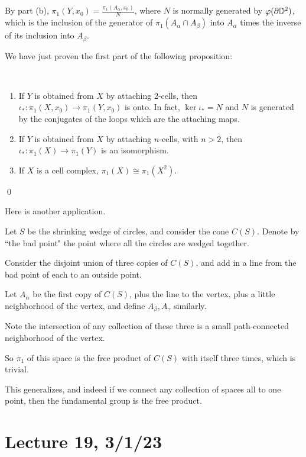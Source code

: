 \documentclass[x11names,reqno,14pt]{extarticle}
\begin{document}
By part (b), $\pi_1(Y, x_0) = \frac{\pi_1(A_\alpha, x_0)}{N}$, where $N$ is normally generated by $\varphi(\partial\mathbb{D}^2)$, which is the inclusion of the generator of $\pi_1(A_\alpha \cap A_\beta)$ into $A_\alpha$ times the inverse of its inclusion into $A_\beta$. 

We have just proven the first part of the following proposition:

\prop\,

\begin{enumerate}

\item If $Y$ is obtained from $X$ by attaching 2-cells, then $\iota_*:\pi_1(X, x_0) \to \pi_1(Y, x_0)$ is onto. In fact, $\ker\iota_* = N$ and $N$ is generated by the conjugates of the loops which are the attaching maps. 

\item If $Y$ is obtained from $X$ by attaching $n$-cells, with $n > 2$, then $\iota_*:\pi_1(X)\to\pi_1(Y)$ is an isomorphism. 

\item If $X$ is a cell complex, $\pi_1(X) \cong \pi_1(X^2)$.

\end{enumerate}

\proof

\qed

Here is another application. 

Let $S$ be the shrinking wedge of circles, and consider the cone $C(S)$. Denote by ``the bad point" the point where all the circles are wedged together. 

Consider the disjoint union of three copies of $C(S)$, and add in a line from the bad point of each to an outside point. 

Let $A_\alpha$ be the first copy of $C(S)$, plus the line to the vertex, plus a little neighborhood of the vertex, and define $A_\beta, A_\gamma$ similarly. 

Note the intersection of any collection of these three is a small path-connected neighborhood of the vertex. 

So $\pi_1$ of this space is the free product of $C(S)$ with itself three times, which is trivial. 

This generalizes, and indeed if we connect any collection of spaces all to one point, then the fundamental group is the free product. 

\section*{Lecture 19, 3/1/23}
\end{document}
